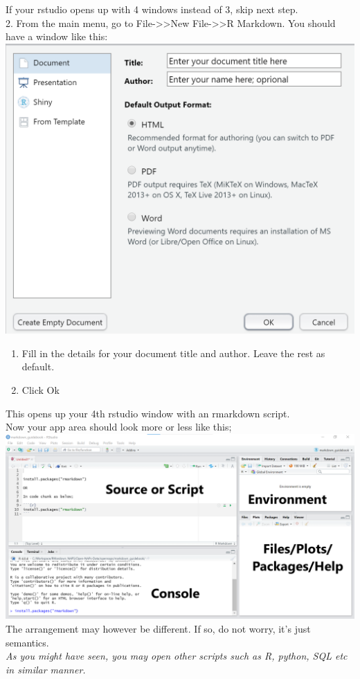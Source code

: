 \documentclass[
]{book}
\providecommand{\tightlist}{%
  \setlength{\itemsep}{0pt}\setlength{\parskip}{0pt}}
\begin{document}
If your rstudio opens up with 4 windows instead of 3, skip next step.\\
2. From the main menu, go to File-\textgreater\textgreater New File-\textgreater\textgreater R Markdown.
You should have a window like this: \includegraphics{tutorial_screenshots/open_rmd_file.png}

\begin{enumerate}
\def\labelenumi{\arabic{enumi}.}
\setcounter{enumi}{2}
\tightlist
\item
  Fill in the details for your document title and author. Leave the rest as default.\\
\item
  Click Ok
\end{enumerate}

This opens up your 4th rstudio window with an rmarkdown script.\\
Now your app area should look more or less like this; \includegraphics{tutorial_screenshots/rstudio_panels_4.png}\\
The arrangement may however be different. If so, do not worry, it's just semantics.\\
\emph{As you might have seen, you may open other scripts such as R, python, SQL etc in similar manner.}
\end{document}
